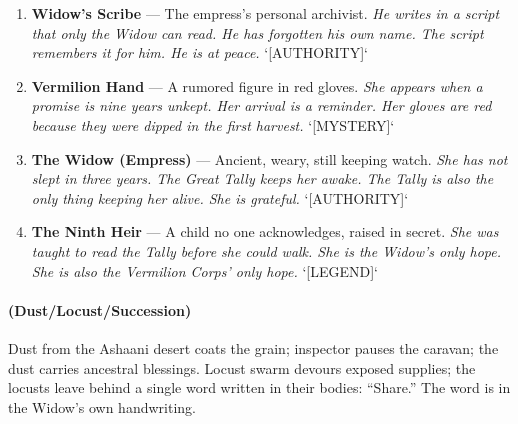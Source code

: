 \begin{enumerate}
\item[J] \textbf{Widow's Scribe} --- The empress's personal archivist.
  \hfill \textit{He writes in a script that only the Widow can read. He has forgotten his own name. The script remembers it for him. He is at peace.} `[AUTHORITY]`
\item[Q] \textbf{Vermilion Hand} --- A rumored figure in red gloves.
  \hfill \textit{She appears when a promise is nine years unkept. Her arrival is a reminder. Her gloves are red because they were dipped in the first harvest.} `[MYSTERY]`
\item[K] \textbf{The Widow (Empress)} --- Ancient, weary, still keeping watch.
  \hfill \textit{She has not slept in three years. The Great Tally keeps her awake. The Tally is also the only thing keeping her alive. She is grateful.} `[AUTHORITY]`
\item[A] \textbf{The Ninth Heir} --- A child no one acknowledges, raised in secret.
  \hfill \textit{She was taught to read the Tally before she could walk. She is the Widow's only hope. She is also the Vermilion Corps' only hope.} `[LEGEND]`
\end{enumerate}

\paragraph*{(Dust/Locust/Succession)} Dust from the Ashaani desert coats the grain; inspector pauses the caravan; the dust carries ancestral blessings. Locust swarm devours exposed supplies; the locusts leave behind a single word written in their bodies: ``Share.'' The word is in the Widow's own handwriting.

